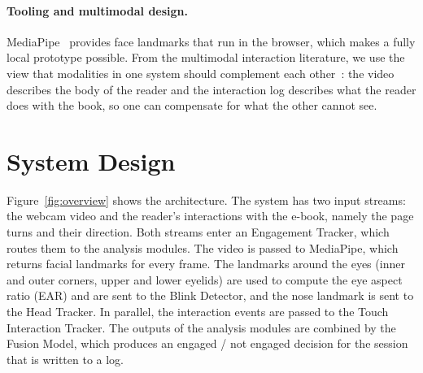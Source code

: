 \documentclass[sigconf,nonacm]{acmart}
\begin{document}
\paragraph{Tooling and multimodal design.}
MediaPipe~\cite{lugaresi2019mediapipe} provides face landmarks that run in the browser, which makes a fully local
prototype possible. From the multimodal interaction literature, we use the view that modalities in one system
should complement each other~\cite{reeves2004guidelines}: the video describes the body of the reader and the
interaction log describes what the reader does with the book, so one can compensate for what the other cannot see.

\section{System Design}\label{sec:design}
Figure~\ref{fig:overview} shows the architecture. The system has two input streams: the webcam video and the reader's
interactions with the e-book, namely the page turns and their direction. Both streams enter an Engagement Tracker,
which routes them to the analysis modules. The video is passed to MediaPipe, which returns facial landmarks for every
frame. The landmarks around the eyes (inner and outer corners, upper and lower eyelids) are used to compute the eye
aspect ratio (EAR) and are sent to the Blink Detector, and the nose landmark is sent to the Head Tracker. In parallel,
the interaction events are passed to the Touch Interaction Tracker. The outputs of the analysis modules are combined by
the Fusion Model, which produces an engaged / not engaged decision for the session that is written to a log.
\end{document}
